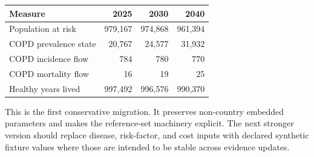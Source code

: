 \documentclass[11pt]{article}
\newcommand{\sectiontitle}[1]{\vspace{9pt}{\large\bfseries #1}\par\vspace{-2pt}}
\begin{document}
\sectiontitle{Headline outputs}
\begin{tabularx}{\textwidth}{@{}p{2.85in}rrr@{}}
\toprule
\textbf{Measure} & \textbf{2025} & \textbf{2030} & \textbf{2040}\\
\midrule
Population at risk & 979,167 & 974,868 & 961,394\\
COPD prevalence state & 20,767 & 24,577 & 31,932\\
COPD incidence flow & 784 & 780 & 770\\
COPD mortality flow & 16 & 19 & 25\\
Healthy years lived & 997,492 & 996,576 & 990,370\\
\bottomrule
\end{tabularx}

\sectiontitle{Limits}
This is the first conservative migration. It preserves non-country embedded parameters and makes the reference-set machinery explicit. The next stronger version should replace disease, risk-factor, and cost inputs with declared synthetic fixture values where those are intended to be stable across evidence updates.
\end{document}
